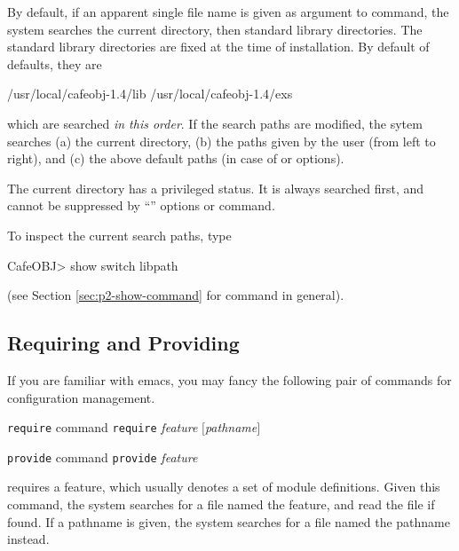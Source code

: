 \documentclass[a4paper]{memoir}
\begin{document}
By default, if an apparent single file name is given as argument to
 command, the system searches the current directory,
then standard library directories. The standard library directories
are fixed at the time of installation. By default of defaults,
they are
\begin{vvtm}
\begin{ccode}
  /usr/local/cafeobj-1.4/lib
  /usr/local/cafeobj-1.4/exs
\end{ccode}
\end{vvtm}
which are searched {\em in this order}. If the search paths are
modified, the sytem searches (a) the current directory,
(b) the paths given by the user (from left to right), and (c) the
above default paths (in case of \kbd{+} or  options).

\begin{warning}
  The current directory has a privileged status. It is always searched
  first, and cannot be suppressed by ``'' options or 
  command.
\end{warning}

To inspect the current search paths, type
\begin{vvtm}
\begin{ccode}
  CafeOBJ> show switch libpath
\end{ccode}
\end{vvtm}
(see Section \ref{sec:p2-show-command} for  command in general).

\subsection{Requiring and Providing}

If you are familiar with emacs, you may fancy the
following pair of commands for configuration management.

\begin{bsyntax} \texttt{require} command \Hline
\texttt{require} \textit{feature} $[$\textit{pathname}$]$
\end{bsyntax}

\begin{bsyntax} \texttt{provide} command \Hline
\texttt{provide} \textit{feature}
\end{bsyntax}

 requires a feature, which usually
denotes a set of module definitions. Given this command, the
system searches for a file named the feature, and read the file
if found. If a pathname is given, the system searches for a file
named the pathname instead.
\end{document}
